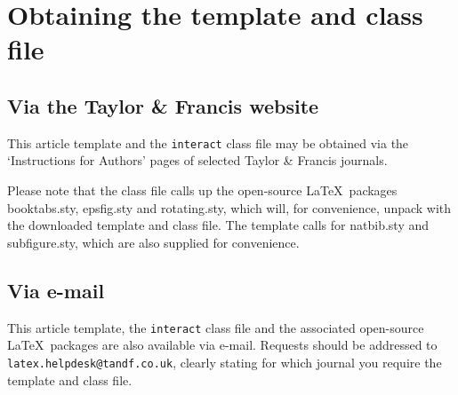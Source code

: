 \section{Obtaining the template and class file}

\subsection{Via the Taylor \& Francis website}

This article template and the \texttt{interact} class file may be obtained via the `Instructions for Authors' pages of selected Taylor \& Francis journals.

Please note that the class file calls up the open-source \LaTeX\ packages booktabs.sty, epsfig.sty and rotating.sty, which will, for convenience, unpack with the downloaded template and class file. The template calls for natbib.sty and subfigure.sty, which are also supplied for convenience.

\subsection{Via e-mail}

This article template, the \texttt{interact} class file and the associated open-source \LaTeX\ packages are also available via e-mail. Requests should be addressed to \texttt{latex.helpdesk@tandf.co.uk}, clearly stating for which journal you require the template and class file.
